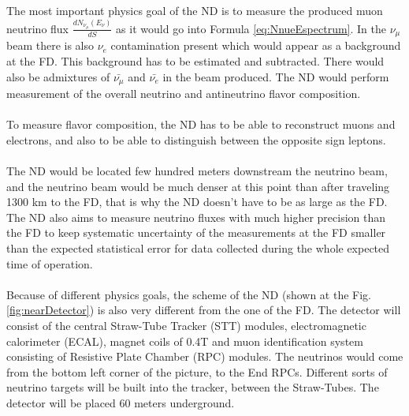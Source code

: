 The most important physics goal of the ND is to measure the produced muon neutrino flux $\frac{dN_{\nu_\mu}(E_{\nu})}{dS}$ as it would go into Formula \ref{eq:NnueEspectrum}. In the $\nu_\mu$ beam there is also $\nu_e$ contamination present which would appear as a background at the FD. This background has to be estimated and subtracted. There would also be admixtures of $\bar{\nu_\mu}$ and $\bar{\nu_e}$ in the beam produced. The ND would perform measurement of the overall neutrino and antineutrino flavor composition. \\ \\
To measure flavor composition, the ND has to be able to reconstruct muons and electrons, and also to be able to distinguish between the opposite sign leptons. \\ \\
The ND would be located few hundred meters downstream the neutrino beam, and the neutrino beam would be much denser at this point than after traveling 1300 km to the FD, that is why the ND doesn't have to be as large as the FD. The ND also aims to measure neutrino fluxes with much higher precision than the FD to keep systematic uncertainty of the measurements at the FD smaller than the expected statistical error for data collected during the whole expected time of operation.\\ \\  
Because of different physics goals, the scheme of the ND (shown at the Fig. \ref{fig:nearDetector}) is also very different from the one of the FD. The detector will consist of the central Straw-Tube Tracker (STT) modules, electromagnetic calorimeter (ECAL), magnet coils of 0.4T and muon identification system consisting of Resistive Plate Chamber (RPC) modules. The neutrinos would come from the bottom left corner of the picture, to the End RPCs. Different sorts of neutrino targets will be built into the tracker, between the Straw-Tubes. The detector will be placed 60 meters underground.\\ \\
